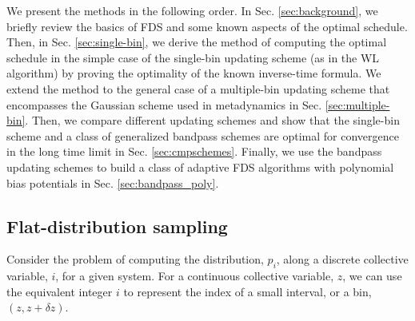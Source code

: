 \documentclass[reprint, superscriptaddress, floatfix]{revtex4-1}
\begin{document}
We present the methods 
in the following order.
%
In Sec. \ref{sec:background},
we briefly review the basics of FDS
and some known aspects of the optimal schedule.
%
Then, in Sec. \ref{sec:single-bin},
we derive the method of
computing the optimal schedule
in the simple case of the
single-bin updating scheme
(as in the WL algorithm)
by proving the optimality
of the known inverse-time formula.
%
We extend the method to the general case
of a multiple-bin updating scheme
that encompasses the Gaussian scheme used in metadynamics
in Sec. \ref{sec:multiple-bin}.
%
Then, we compare different updating schemes
and show that the single-bin scheme
and a class of generalized bandpass schemes
are optimal for convergence
in the long time limit
in Sec. \ref{sec:cmpschemes}.
%
Finally,
we use the bandpass updating schemes
to build a class of adaptive FDS algorithms
with polynomial bias potentials
in Sec. \ref{sec:bandpass_poly}.



\subsection{\label{sec:background}
Flat-distribution sampling}






Consider the problem of computing
the distribution, $p_i$,
along a discrete collective variable, $i$,
for a given system.
%
%
For a continuous collective variable, $z$,
we can use the equivalent integer $i$ to represent
the index of a small interval, or a bin,
$(z, z + \delta z)$.
%
\end{document}
